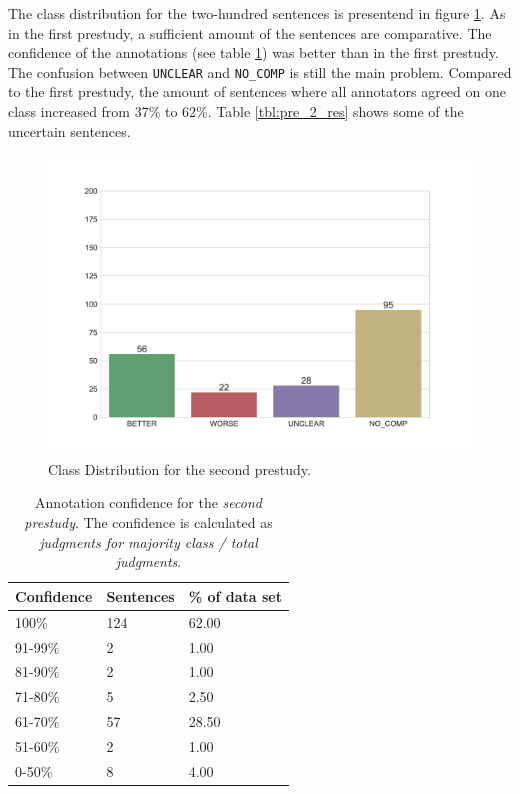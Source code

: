 The class distribution for the two-hundred sentences is presentend in figure \ref{fig:dist_pre_b}.  As in the first prestudy, a sufficient amount of the sentences are comparative. The confidence of the annotations (see table \ref{tbl:pre_b_agg}) was better than in the first prestudy. The confusion between \texttt{UNCLEAR} and \texttt{NO\_COMP} is still the main problem. Compared to the first prestudy, the amount of sentences where all annotators agreed on one class increased from 37\% to 62\%. Table \ref{tbl:pre_2_res} shows some of the uncertain sentences.


\begin{figure}[tb]
\centering
\caption{Class Distribution for the second prestudy.}
\label{fig:dist_pre_b}
\includegraphics[width=0.8\linewidth]{images/dataset/preb-dist}
\end{figure}


\begin{table}[tp]
\caption{Annotation confidence for the \emph{second prestudy}. The confidence is calculated as \emph{judgments for majority class / total judgments}.}
\label{tbl:pre_b_agg}
\begin{tabularx}{\textwidth}{XXX}
\toprule
Confidence & Sentences & \% of data set \\
\midrule
100\%	&	124	&	62.00	 \\ 
91-99\%	&	2	&	1.00	 \\ 
81-90\%	&	2	&	1.00	 \\ 
71-80\%	&	5	&	2.50	 \\ 
61-70\%	&	57	&	28.50	 \\ 
51-60\%	&	2	&	1.00	 \\ 
0-50\%	&	8	&	4.00	 \\ 
\bottomrule
\end{tabularx}
\end{table}



